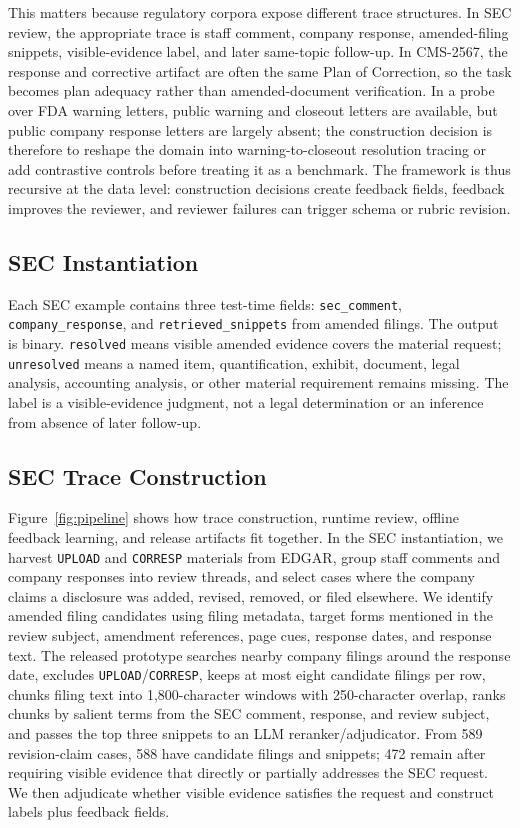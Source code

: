 \documentclass[11pt]{article}
\begin{document}
This matters because regulatory corpora expose different trace structures. In SEC review, the appropriate trace is staff comment, company response, amended-filing snippets, visible-evidence label, and later same-topic follow-up. In CMS-2567, the response and corrective artifact are often the same Plan of Correction, so the task becomes plan adequacy rather than amended-document verification. In a probe over FDA warning letters, public warning and closeout letters are available, but public company response letters are largely absent; the construction decision is therefore to reshape the domain into warning-to-closeout resolution tracing or add contrastive controls before treating it as a benchmark. The framework is thus recursive at the data level: construction decisions create feedback fields, feedback improves the reviewer, and reviewer failures can trigger schema or rubric revision.

\subsection{SEC Instantiation}

Each SEC example contains three test-time fields: \texttt{sec\_comment}, \texttt{company\_response}, and \texttt{retrieved\_snippets} from amended filings. The output is binary. \texttt{resolved} means visible amended evidence covers the material request; \texttt{unresolved} means a named item, quantification, exhibit, document, legal analysis, accounting analysis, or other material requirement remains missing. The label is a visible-evidence judgment, not a legal determination or an inference from absence of later follow-up.

\subsection{SEC Trace Construction}

Figure~\ref{fig:pipeline} shows how trace construction, runtime review, offline feedback learning, and release artifacts fit together. In the SEC instantiation, we harvest \texttt{UPLOAD} and \texttt{CORRESP} materials from EDGAR, group staff comments and company responses into review threads, and select cases where the company claims a disclosure was added, revised, removed, or filed elsewhere. We identify amended filing candidates using filing metadata, target forms mentioned in the review subject, amendment references, page cues, response dates, and response text. The released prototype searches nearby company filings around the response date, excludes \texttt{UPLOAD}/\texttt{CORRESP}, keeps at most eight candidate filings per row, chunks filing text into 1,800-character windows with 250-character overlap, ranks chunks by salient terms from the SEC comment, response, and review subject, and passes the top three snippets to an LLM reranker/adjudicator. From 589 revision-claim cases, 588 have candidate filings and snippets; 472 remain after requiring visible evidence that directly or partially addresses the SEC request. We then adjudicate whether visible evidence satisfies the request and construct labels plus feedback fields.
\end{document}
